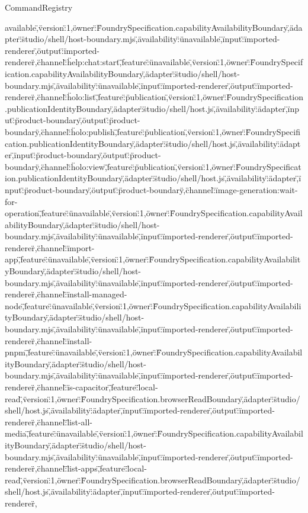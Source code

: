 \begin{lexlean}{CommandRegistry}
\begin{semanticmodule}
{available\",\"version\":1,\"owner\":\"FoundrySpecification.capabilityAvailabilityBoundary\",\"adapter\":\"studio/shell/host-boundary.mjs\",\"availability\":\"unavailable\",\"input\":\"imported-renderer\",\"output\":\"imported-renderer\"},{\"channel\":\"help:chat:start\",\"feature\":\"unavailable\",\"version\":1,\"owner\":\"FoundrySpecification.capabilityAvailabilityBoundary\",\"adapter\":\"studio/shell/host-boundary.mjs\",\"availability\":\"unavailable\",\"input\":\"imported-renderer\",\"output\":\"imported-renderer\"},{\"channel\":\"holo:list\",\"feature\":\"publication\",\"version\":1,\"owner\":\"FoundrySpecification.publicationIdentityBoundary\",\"adapter\":\"studio/shell/host.js\",\"availability\":\"adapter\",\"input\":\"product-boundary\",\"output\":\"product-boundary\"},{\"channel\":\"holo:publish\",\"feature\":\"publication\",\"version\":1,\"owner\":\"FoundrySpecification.publicationIdentityBoundary\",\"adapter\":\"studio/shell/host.js\",\"availability\":\"adapter\",\"input\":\"product-boundary\",\"output\":\"product-boundary\"},{\"channel\":\"holo:view\",\"feature\":\"publication\",\"version\":1,\"owner\":\"FoundrySpecification.publicationIdentityBoundary\",\"adapter\":\"studio/shell/host.js\",\"availability\":\"adapter\",\"input\":\"product-boundary\",\"output\":\"product-boundary\"},{\"channel\":\"image-generation:wait-for-operation\",\"feature\":\"unavailable\",\"version\":1,\"owner\":\"FoundrySpecification.capabilityAvailabilityBoundary\",\"adapter\":\"studio/shell/host-boundary.mjs\",\"availability\":\"unavailable\",\"input\":\"imported-renderer\",\"output\":\"imported-renderer\"},{\"channel\":\"import-app\",\"feature\":\"unavailable\",\"version\":1,\"owner\":\"FoundrySpecification.capabilityAvailabilityBoundary\",\"adapter\":\"studio/shell/host-boundary.mjs\",\"availability\":\"unavailable\",\"input\":\"imported-renderer\",\"output\":\"imported-renderer\"},{\"channel\":\"install-managed-node\",\"feature\":\"unavailable\",\"version\":1,\"owner\":\"FoundrySpecification.capabilityAvailabilityBoundary\",\"adapter\":\"studio/shell/host-boundary.mjs\",\"availability\":\"unavailable\",\"input\":\"imported-renderer\",\"output\":\"imported-renderer\"},{\"channel\":\"install-pnpm\",\"feature\":\"unavailable\",\"version\":1,\"owner\":\"FoundrySpecification.capabilityAvailabilityBoundary\",\"adapter\":\"studio/shell/host-boundary.mjs\",\"availability\":\"unavailable\",\"input\":\"imported-renderer\",\"output\":\"imported-renderer\"},{\"channel\":\"is-capacitor\",\"feature\":\"local-read\",\"version\":1,\"owner\":\"FoundrySpecification.browserReadBoundary\",\"adapter\":\"studio/shell/host.js\",\"availability\":\"adapter\",\"input\":\"imported-renderer\",\"output\":\"imported-renderer\"},{\"channel\":\"list-all-media\",\"feature\":\"unavailable\",\"version\":1,\"owner\":\"FoundrySpecification.capabilityAvailabilityBoundary\",\"adapter\":\"studio/shell/host-boundary.mjs\",\"availability\":\"unavailable\",\"input\":\"imported-renderer\",\"output\":\"imported-renderer\"},{\"channel\":\"list-apps\",\"feature\":\"local-read\",\"version\":1,\"owner\":\"FoundrySpecification.browserReadBoundary\",\"adapter\":\"studio/shell/host.js\",\"availability\":\"adapter\",\"input\":\"imported-renderer\",\"output\":\"imported-renderer\"},{}
\end{semanticmodule}
\end{lexlean}
